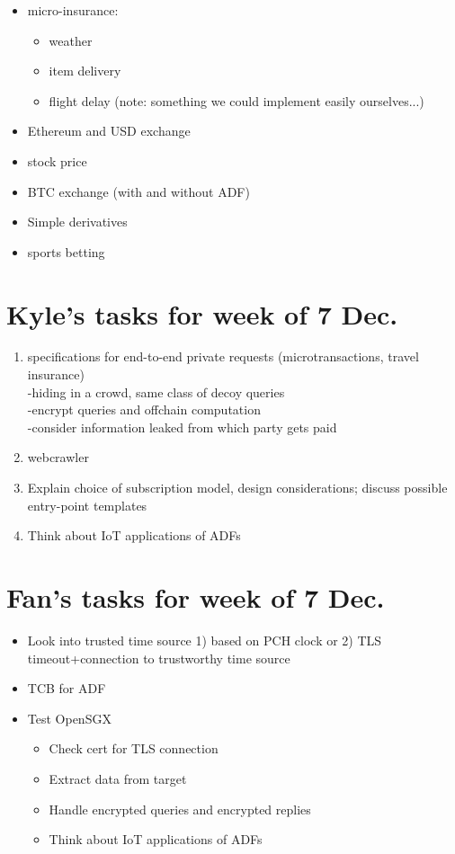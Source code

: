 \documentclass[letterpaper,twocolumn,10pt]{article}
\begin{document}
\begin{itemize}
\item micro-insurance:
    \begin{itemize}
    \item weather
    \item item delivery
    \item flight delay (note: something we could implement easily ourselves...)
    \end{itemize}
\item Ethereum and USD exchange
\item stock price
\item BTC exchange (with and without ADF)
\item Simple derivatives
\item sports betting
\end{itemize}

\section{Kyle's tasks for week of 7 Dec.}
\begin{enumerate}
\item specifications for end-to-end private requests (microtransactions, travel insurance)\\
-hiding in a crowd, same class of decoy queries\\
-encrypt queries and offchain computation \\
-consider information leaked from which party gets paid
\item webcrawler
\item Explain choice of subscription model, design considerations; discuss possible entry-point templates
\item Think about IoT applications of ADFs
\end{enumerate}

\section{Fan's tasks for week of 7 Dec.}
\begin{itemize}
\item Look into trusted time source 1) based on PCH clock or 2) TLS timeout+connection to trustworthy time source
\item TCB for ADF
\item Test OpenSGX
\begin{itemize}
\item Check cert for TLS connection
\item Extract data from target
\item Handle encrypted queries and encrypted replies
\item Think about IoT applications of ADFs
\end{itemize}
\end{itemize}

{\footnotesize 
}
\end{document}
